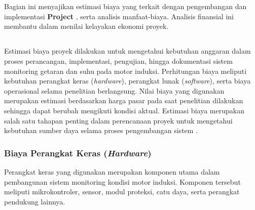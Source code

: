 \documentclass{elsinta}
\begin{document}
\section{\FinancialAnalysisTitle}

Bagian ini menyajikan estimasi biaya yang terkait dengan pengembangan dan implementasi \textbf{Project }, serta analisis manfaat-biaya. Analisis finansial ini membantu dalam menilai kelayakan ekonomi proyek.

\subsection{\CostEstimationTitle}
Estimasi biaya proyek dilakukan untuk mengetahui kebutuhan anggaran dalam proses perancangan, implementasi, pengujian, hingga dokumentasi sistem monitoring getaran dan suhu pada motor induksi. Perhitungan biaya meliputi kebutuhan perangkat keras (\textit{hardware}), perangkat lunak (\textit{software}), serta biaya operasional selama penelitian berlangsung. Nilai biaya yang digunakan merupakan estimasi berdasarkan harga pasar pada saat penelitian dilakukan sehingga dapat berubah mengikuti kondisi aktual. Estimasi biaya merupakan salah satu tahapan penting dalam perencanaan proyek untuk mengetahui kebutuhan sumber daya selama proses pengembangan sistem \cite{ProjectManagementInstitute2021,kerzner2022}.

\subsubsection{Biaya Perangkat Keras (\textit{Hardware})}

Perangkat keras yang digunakan merupakan komponen utama dalam pembangunan sistem monitoring kondisi motor induksi. Komponen tersebut meliputi mikrokontroler, sensor, modul proteksi, catu daya, serta perangkat pendukung lainnya.
\end{document}
